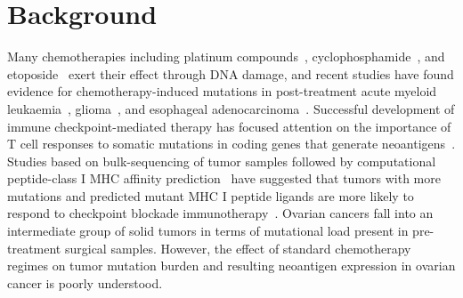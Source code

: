\documentclass[linenumbers]{bmcart}
\begin{document}


\section*{Background}

Many chemotherapies including platinum compounds~\cite{Hannan_1989}, cyclophosphamide~\cite{Anderson_1995}, and etoposide~\cite{NAKANOMYO_1986} exert their effect through DNA damage, and recent studies have found evidence for chemotherapy-induced mutations in post-treatment acute myeloid leukaemia~\cite{Ding_2012}, glioma~\cite{Johnson_2013}, and esophageal adenocarcinoma~\cite{Murugaesu_2015}. Successful development of immune checkpoint-mediated therapy\cite{Chen_2013} has focused attention on the importance of T cell responses to somatic mutations in coding genes that generate neoantigens~\cite{Schumacher_2015}. Studies based on bulk-sequencing of tumor samples followed by computational peptide-class I MHC affinity prediction~\cite{Lundegaard_2007} have suggested that tumors with more mutations and predicted mutant MHC I peptide ligands are more likely to respond to checkpoint blockade immunotherapy~\cite{Van_Allen_2015,Rizvi_2015}. Ovarian cancers fall into an intermediate group of solid tumors in terms of mutational load present in pre-treatment surgical samples\cite{Lawrence_2013}. However, the effect of standard chemotherapy regimes on tumor mutation burden and resulting neoantigen expression in ovarian cancer is poorly understood.
\end{document}
